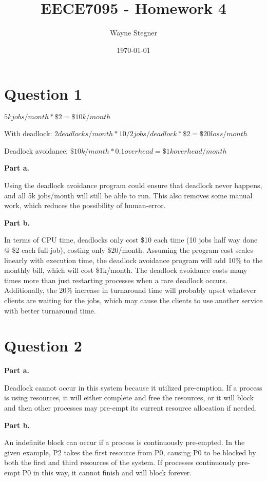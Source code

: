 \documentclass[a4paper]{article}
\title{EECE7095 - Homework 4}
\author{Wayne Stegner}
\date{\today}
\begin{document}
	\maketitle
	\section{Question 1}
	\par $5k jobs/month * \$2 = \$10k/month$
	\par With deadlock:
	$2 deadlocks/month * 10/2 jobs/deadlock * \$2 = \$20 loss/month$
	\par Deadlock avoidance:
	$\$10k/month * 0.1 overhead = \$1k overhead/month$
	\par \textbf{Part a.}
	\par Using the deadlock avoidance program could ensure that deadlock never
	happens, and all 5k jobs/month will still be able to run.
	This also removes some manual work, which reduces the possibility of
	human-error.
	\par \textbf{Part b.}
	\par In terms of CPU time, deadlocks only cost \$10 each time (10 jobs half
	way done @ \$2 each full job), costing only \$20/month.
	Assuming the program cost scales linearly with execution time, the deadlock
	avoidance program will add 10\% to the monthly bill, which will cost
	\$1k/month.
	The deadlock avoidance costs many times more than just restarting processes
	when a rare deadlock occurs.
	Additionally, the 20\% increase in turnaround time will probably upset
	whatever clients are waiting for the jobs, which may cause the clients to use
	another service with better turnaround time.

	\section{Question 2}
	\par \textbf{Part a.}
	\par Deadlock cannot occur in this system because it utilized pre-emption.
	If a process is using resources, it will either complete and free the
	resources, or it will block and then other processes may pre-empt its current
	resource allocation if needed.
	\par \textbf{Part b.}
	\par An indefinite block can occur if a process is continuously pre-empted.
	In the given example, P2 takes the first resource from P0, causing P0 to be
	blocked by both the first and third resources of the system.
	If processes continuously pre-empt P0 in this way, it cannot finish and will
	block forever.
\end{document}
